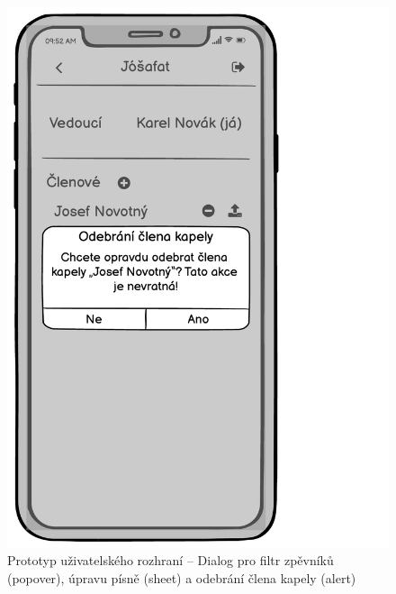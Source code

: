 \begin{figure}
    \includegraphics[width=\textwidth/3 - 2pt]{images/3-navrh/3-7-dialog-odebrani.pdf}
    \caption[Prototyp uživatelského rozhraní -- dialogy]{Prototyp uživatelského rozhraní -- Dialog pro filtr zpěvníků (popover), úpravu písně (sheet) a odebrání člena kapely (alert)}
\end{figure}
